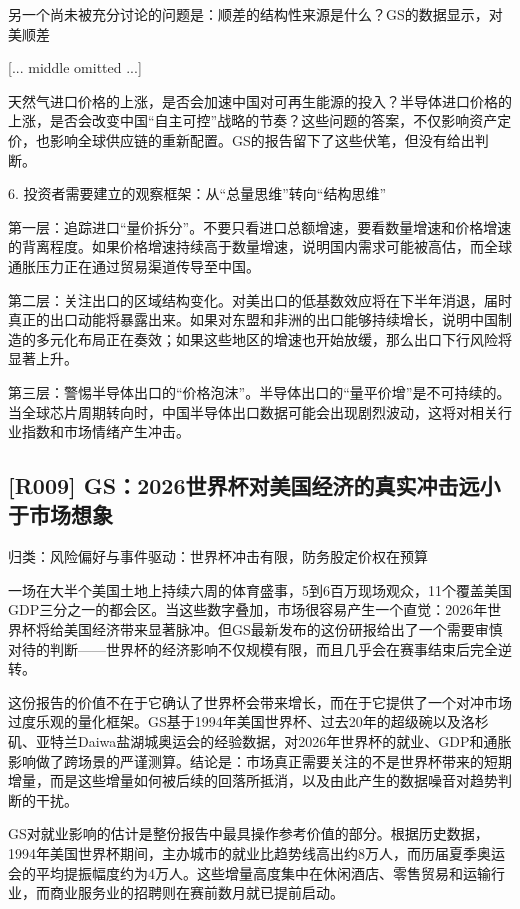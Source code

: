 \documentclass[11pt]{ctexart}
\begin{document}
另一个尚未被充分讨论的问题是：顺差的结构性来源是什么？GS的数据显示，对美顺差

[... middle omitted ...]

天然气进口价格的上涨，是否会加速中国对可再生能源的投入？半导体进口价格的上涨，是否会改变中国“自主可控”战略的节奏？这些问题的答案，不仅影响资产定价，也影响全球供应链的重新配置。GS的报告留下了这些伏笔，但没有给出判断。

6. 投资者需要建立的观察框架：从“总量思维”转向“结构思维”

第一层：追踪进口“量价拆分”。不要只看进口总额增速，要看数量增速和价格增速的背离程度。如果价格增速持续高于数量增速，说明国内需求可能被高估，而全球通胀压力正在通过贸易渠道传导至中国。

第二层：关注出口的区域结构变化。对美出口的低基数效应将在下半年消退，届时真正的出口动能将暴露出来。如果对东盟和非洲的出口能够持续增长，说明中国制造的多元化布局正在奏效；如果这些地区的增速也开始放缓，那么出口下行风险将显著上升。

第三层：警惕半导体出口的“价格泡沫”。半导体出口的“量平价增”是不可持续的。当全球芯片周期转向时，中国半导体出口数据可能会出现剧烈波动，这将对相关行业指数和市场情绪产生冲击。

\subsection{[R009] GS：2026世界杯对美国经济的真实冲击远小于市场想象}
{\small\color{refgray}归类：风险偏好与事件驱动：世界杯冲击有限，防务股定价权在预算}

一场在大半个美国土地上持续六周的体育盛事，5到6百万现场观众，11个覆盖美国GDP三分之一的都会区。当这些数字叠加，市场很容易产生一个直觉：2026年世界杯将给美国经济带来显著脉冲。但GS最新发布的这份研报给出了一个需要审慎对待的判断——世界杯的经济影响不仅规模有限，而且几乎会在赛事结束后完全逆转。

这份报告的价值不在于它确认了世界杯会带来增长，而在于它提供了一个对冲市场过度乐观的量化框架。GS基于1994年美国世界杯、过去20年的超级碗以及洛杉矶、亚特兰Daiwa盐湖城奥运会的经验数据，对2026年世界杯的就业、GDP和通胀影响做了跨场景的严谨测算。结论是：市场真正需要关注的不是世界杯带来的短期增量，而是这些增量如何被后续的回落所抵消，以及由此产生的数据噪音对趋势判断的干扰。

GS对就业影响的估计是整份报告中最具操作参考价值的部分。根据历史数据，1994年美国世界杯期间，主办城市的就业比趋势线高出约8万人，而历届夏季奥运会的平均提振幅度约为4万人。这些增量高度集中在休闲酒店、零售贸易和运输行业，而商业服务业的招聘则在赛前数月就已提前启动。
\end{document}

